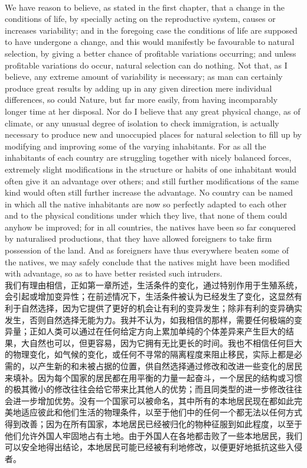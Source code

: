 \documentclass{article}
\begin{document}
\\
We have reason to believe, as stated in the first chapter, that a change in the conditions of life, by specially acting on the reproductive system, causes or increases variability; and in the foregoing case the conditions of life are supposed to have undergone a change, and this would manifestly be favourable to natural selection, by giving a better chance of profitable variations occurring; and unless profitable variations do occur, natural selection can do nothing. Not that, as I believe, any extreme amount of variability is necessary; as man can certainly produce great results by adding up in any given direction mere individual differences, so could Nature, but far more easily, from having incomparably longer time at her disposal. Nor do I believe that any great physical change, as of climate, or any unusual degree of isolation to check immigration, is actually necessary to produce new and unoccupied places for natural selection to fill up by modifying and improving some of the varying inhabitants. For as all the inhabitants of each country are struggling together with nicely balanced forces, extremely slight modifications in the structure or habits of one inhabitant would often give it an advantage over others; and still further modifications of the same kind would often still further increase the advantage. No country can be named in which all the native inhabitants are now so perfectly adapted to each other and to the physical conditions under which they live, that none of them could anyhow be improved; for in all countries, the natives have been so far conquered by naturalised productions, that they have allowed foreigners to take firm possession of the land. And as foreigners have thus everywhere beaten some of the natives, we may safely conclude that the natives might have been modified with advantage, so as to have better resisted such intruders.\\
我们有理由相信，正如第一章所述，生活条件的变化，通过特别作用于生殖系统，会引起或增加变异性；在前述情况下，生活条件被认为已经发生了变化，这显然有利于自然选择，因为它提供了更好的机会让有利的变异发生；除非有利的变异确实发生，否则自然选择无能为力。我并不认为，如我相信的那样，需要任何极端的变异量；正如人类可以通过在任何给定方向上累加单纯的个体差异来产生巨大的结果，大自然也可以，但更容易，因为它拥有无比更长的时间。我也不相信任何巨大的物理变化，如气候的变化，或任何不寻常的隔离程度来阻止移民，实际上都是必需的，以产生新的和未被占据的位置，供自然选择通过修改和改进一些变化的居民来填补。因为每个国家的居民都在用平衡的力量一起奋斗，一个居民的结构或习惯的极其微小的修改往往会给它带来比其他人的优势；而且同类型的进一步修改往往会进一步增加优势。没有一个国家可以被命名，其中所有的本地居民现在都如此完美地适应彼此和他们生活的物理条件，以至于他们中的任何一个都无法以任何方式得到改善；因为在所有国家，本地居民已经被归化的物种征服到如此程度，以至于他们允许外国人牢固地占有土地。由于外国人在各地都击败了一些本地居民，我们可以安全地得出结论，本地居民可能已经被有利地修改，以便更好地抵抗这些入侵者。
\end{document}
